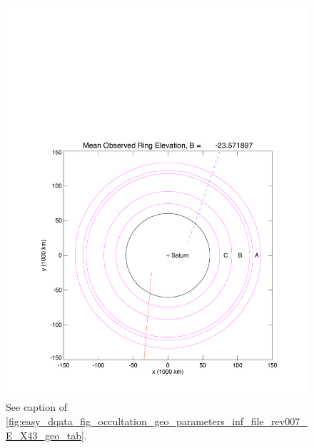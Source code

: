 \documentclass[crop=false,class=book]{standalone}
\begin{document}
\begin{figure}[H]
        \includegraphics[page=3,trim = {0.8in 0.5in 0.21in 0.45in},clip,width=\textwidth]{Rev007_E_X43_summary_p1_08FEB2018.pdf}
	        \caption[More Occultation Geometry]{See caption of \ref{fig:easy_dqata_fig_occultation_geo_parameters_inf_file_rev007_E_X43_geo_tab}.}
	\end{figure}
\end{document}
